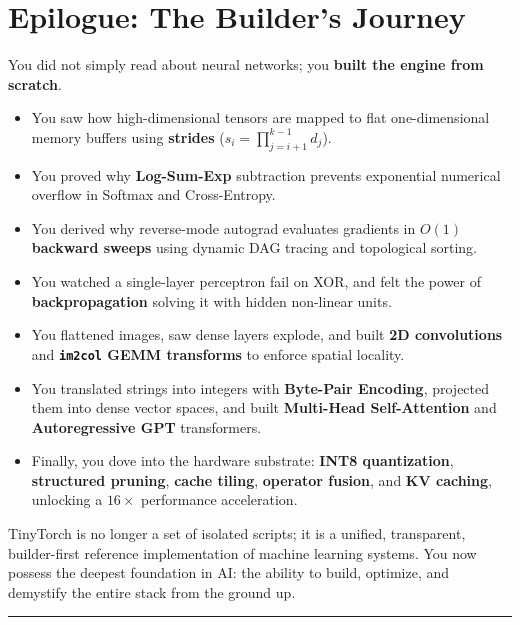 \documentclass[
  letterpaper,
]{scrbook}
\providecommand{\tightlist}{%
  \setlength{\itemsep}{0pt}\setlength{\parskip}{0pt}}
\begin{document}
\section*{Epilogue: The Builder's
Journey}\label{epilogue-the-builders-journey}


You did not simply read about neural networks; you \textbf{built the
engine from scratch}.

\begin{itemize}
\tightlist
\item
  You saw how high-dimensional tensors are mapped to flat
  one-dimensional memory buffers using \textbf{strides}
  (\(s_i = \prod_{j=i+1}^{k-1} d_j\)).
\item
  You proved why \textbf{Log-Sum-Exp} subtraction prevents exponential
  numerical overflow in Softmax and Cross-Entropy.
\item
  You derived why reverse-mode autograd evaluates gradients in
  \textbf{\(O(1)\) backward sweeps} using dynamic DAG tracing and
  topological sorting.
\item
  You watched a single-layer perceptron fail on XOR, and felt the power
  of \textbf{backpropagation} solving it with hidden non-linear units.
\item
  You flattened images, saw dense layers explode, and built \textbf{2D
  convolutions} and \textbf{\texttt{im2col} GEMM transforms} to enforce
  spatial locality.
\item
  You translated strings into integers with \textbf{Byte-Pair Encoding},
  projected them into dense vector spaces, and built \textbf{Multi-Head
  Self-Attention} and \textbf{Autoregressive GPT} transformers.
\item
  Finally, you dove into the hardware substrate: \textbf{INT8
  quantization}, \textbf{structured pruning}, \textbf{cache tiling},
  \textbf{operator fusion}, and \textbf{KV caching}, unlocking a
  \(16\times\) performance acceleration.
\end{itemize}

TinyTorch is no longer a set of isolated scripts; it is a unified,
transparent, builder-first reference implementation of machine learning
systems. You now possess the deepest foundation in AI: the ability to
build, optimize, and demystify the entire stack from the ground up.

\begin{center}\rule{0.5\linewidth}{0.5pt}\end{center}
\end{document}
